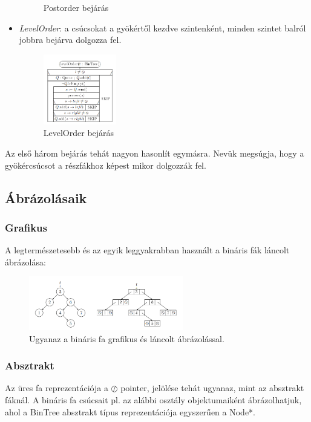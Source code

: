 \documentclass[margin=0px]{article}
\begin{document}
\begin{itemize}
\begin{figure}[H]
            \caption{Postorder bejárás}
        \end{figure}
    \item \textit{LevelOrder}: a csúcsokat a gyökértől kezdve szintenként, minden szintet balról jobbra bejárva dolgozza fel.
        \begin{figure}[H]
            \centering
            \includegraphics[width=0.3\textwidth]{img/levelOrder.png}
            \caption{LevelOrder bejárás}
        \end{figure}
\end{itemize}

Az első három bejárás tehát nagyon hasonlít egymásra. Nevük megsúgja,
hogy a gyökércsúcsot a részfákhoz képest mikor dolgozzák fel.

\subsection{Ábrázolásaik}
\subsubsection{Grafikus}
A legtermészetesebb és az egyik leggyakrabban használt a bináris fák láncolt
ábrázolása:
\begin{figure}[H]
    \centering
    \includegraphics[width=0.6\textwidth]{img/abrazolas.png}
    \caption{Ugyanaz a bináris fa grafikus és láncolt ábrázolással.}
\end{figure}


\subsubsection{Absztrakt}
Az üres fa reprezentációja a $\oslash$  pointer, jelölése tehát ugyanaz, mint az
absztrakt fáknál. A bináris fa csúcsait pl. az alábbi osztály objektumaiként
ábrázolhatjuk, ahol a BinTree absztrakt típus reprezentációja egyszerűen a
Node*.
\end{document}
